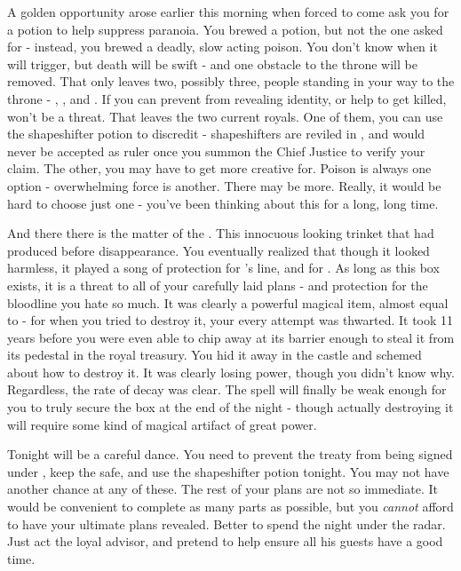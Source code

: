 \documentclass[char]{NeptuneBall}
\begin{document}
A golden opportunity arose earlier this morning when \cKing{} forced \cPlant{} to come ask you for a potion to help suppress paranoia. You brewed a potion, but not the one \cPlant{\they} asked for - instead, you brewed a deadly, slow acting poison. You don't know when it will trigger, but death will be swift - and one obstacle to the throne will be removed. That only leaves two, possibly three, people standing in your way to the throne - \cKing{}, \cPrincess{}, and \cQueen{}. If you can prevent \cQueen{} from revealing \cQueen{\their} identity, or help to get \cQueen{\them} killed, \cQueen{\they} won't be a threat. That leaves the two current royals. One of them, you can use the shapeshifter potion to discredit - shapeshifters are reviled in \pAtlantis{}, and would never be accepted as ruler once you summon the Chief Justice to verify your claim. The other, you may have to get more creative for. Poison is always one option - overwhelming force is another. There may be more. Really, it would be hard to choose just one - you've been thinking about this for a long, long time.

And there there is the matter of the \iMusicBox{\MYname}. This innocuous looking trinket that \cQueen{} had produced before \cQueen{\their} disappearance. You eventually realized that though it looked harmless, it played a song of protection for \cExExKing{}'s line, and for \pAtlantis{}. As long as this box exists, it is a threat to all of your carefully laid plans - and protection for the bloodline you hate so much. It was clearly a powerful magical item, almost equal to \iTrident{\MYname} - for when you tried to destroy it, your every attempt was thwarted. It took 11 years before you were even able to chip away at its barrier enough to steal it from its pedestal in the royal treasury. You hid it away in the castle and schemed about how to destroy it. It was clearly losing power, though you didn't know why. Regardless, the rate of decay was clear. The spell will finally be weak enough for you to truly secure the box at the end of the night - though actually destroying it will require some kind of magical artifact of great power.

Tonight will be a careful dance. You need to prevent the treaty from being signed under \cKing{}, keep the \iMusicBox{} safe, and use the shapeshifter potion tonight. You may not have another chance at any of these. The rest of your plans are not so immediate. It would be convenient to complete as many parts as possible, but you \emph{cannot} afford to have your ultimate plans revealed. Better to spend the night under the radar. Just act the loyal advisor, and pretend to help \cKing{} ensure all his guests have a good time.
\end{document}
